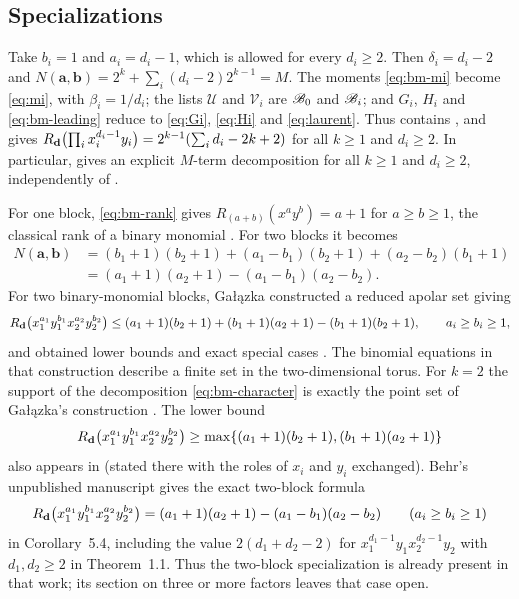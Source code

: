 \subsection{Specializations}

\begin{remark}[The case $b_i=1$]\label{rem:bm-W}
Take $b_i=1$ and $a_i=d_i-1$, which is allowed for every $d_i\ge2$.
Then $\delta_i=d_i-2$ and
$N(\mathbf a,\mathbf b)=2^k+\sum_i(d_i-2)2^{k-1}=M$. The moments
\eqref{eq:bm-mi} become \eqref{eq:mi}, with $\beta_i=1/d_i$; the lists
$\mathscr U$ and $\mathscr V_i$ are $\mathscr B_0$ and $\mathscr B_i$; and
$G_i$, $H_i$ and \eqref{eq:bm-leading} reduce to \eqref{eq:Gi},
\eqref{eq:Hi} and \eqref{eq:laurent}. Thus  contains
, and gives
$R_{\mathbf d}\bigl(\prod_ix_i^{d_i-1}y_i\bigr)=2^{k-1}(\sum_id_i-2k+2)$
for all $k\ge1$ and $d_i\ge2$. In particular,
 gives an explicit $M$-term decomposition for all
$k\ge1$ and $d_i\ge2$, independently of
\cite[Theorem~1.1]{CCS2025}.
\end{remark}

For one block, \eqref{eq:bm-rank} gives $R_{(a+b)}(x^ay^b)=a+1$ for
$a\ge b\ge1$, the classical rank of a binary monomial
\cite[Section~4.3 of the arXiv version]{BBGOV2021}. For two blocks
it becomes
\begin{align*}
N(\mathbf a,\mathbf b)
&=(b_1+1)(b_2+1)+(a_1-b_1)(b_2+1)+(a_2-b_2)(b_1+1)\\
&=(a_1+1)(a_2+1)-(a_1-b_1)(a_2-b_2).
\end{align*}
For two binary-monomial blocks, Ga{\l}{\selectfont\k{a}}zka constructed a reduced
apolar set giving
\[
R_{\mathbf d}\bigl(x_1^{a_1}y_1^{b_1}x_2^{a_2}y_2^{b_2}\bigr)
\le(a_1+1)(b_2+1)+(b_1+1)(a_2+1)-(b_1+1)(b_2+1),
\qquad a_i\ge b_i\ge1,
\]
and obtained lower bounds and exact special cases
\cite[Theorem~1.5 and Section~7.1 of the arXiv version]{Galazka2023}.
The binomial equations in that construction describe a finite set in
the two-dimensional torus. For $k=2$ the support of the decomposition
\eqref{eq:bm-character} is exactly the point set of
Ga{\l}{\selectfont\k{a}}zka's construction
\cite[Section~7.1 of the arXiv version]{Galazka2023}. The lower bound
\[
R_{\mathbf d}\bigl(x_1^{a_1}y_1^{b_1}x_2^{a_2}y_2^{b_2}\bigr)
\ge\max\{(a_1+1)(b_2+1),(b_1+1)(a_2+1)\}
\]
also appears in
\cite[Proposition~4.3 of the arXiv version]{BBGOV2021} (stated there
with the roles of $x_i$ and $y_i$ exchanged). Behr's
unpublished manuscript \cite{Behr2026} gives the exact two-block
formula
\[
R_{\mathbf d}\bigl(x_1^{a_1}y_1^{b_1}x_2^{a_2}y_2^{b_2}\bigr)
=(a_1+1)(a_2+1)-(a_1-b_1)(a_2-b_2)
\qquad(a_i\ge b_i\ge1)
\]
in Corollary~5.4, including the value $2(d_1+d_2-2)$ for
$x_1^{d_1-1}y_1x_2^{d_2-1}y_2$ with $d_1,d_2\ge2$ in Theorem~1.1.
Thus the two-block specialization is already present in that work; its
section on three or more factors leaves that case open.


